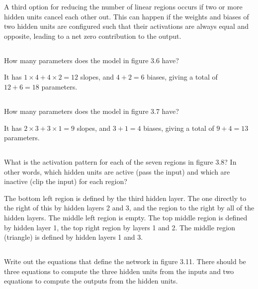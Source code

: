 \documentclass[12pt]{report}
\begin{document}
A third option for reducing the number of linear regions occurs if two or more hidden units cancel each other out. This can happen if the weights and biases of two hidden units are configured such that their activations are always equal and opposite, leading to a net zero contribution to the output.

\subsection{}
\begin{mdframed}
    How many parameters does the model in figure 3.6 have?
\end{mdframed}

It has $1 \times 4 + 4 \times 2 = 12$ slopes, and $4 + 2 = 6$ biases, giving a total of $12 + 6 = 18$ parameters.

\subsection{}
\begin{mdframed}
    How many parameters does the model in figure 3.7 have?
\end{mdframed}

It has $2 \times 3 + 3 \times 1 = 9$ slopes, and $3 + 1 = 4$ biases, giving a total of $9 + 4 = 13$ parameters.

\subsection{}
\begin{mdframed}
    What is the activation pattern for each of the seven regions in figure 3.8? In other words, which hidden units are active (pass the input) and which are inactive (clip the input) for each region?
\end{mdframed}

The bottom left region is defined by the third hidden layer. The one directly to the right of this by hidden layers 2 and 3, and the region to the right by all of the hidden layers. The middle left region is empty. The top middle region is defined by hidden layer 1, the top right region by layers 1 and 2. The middle region (triangle) is defined by hidden layers 1 and 3.

\subsection{}
\begin{mdframed}
    Write out the equations that define the network in figure 3.11. There should be three equations to compute the three hidden units from the inputs and two equations to compute the outputs from the hidden units.
\end{mdframed}
\end{document}
